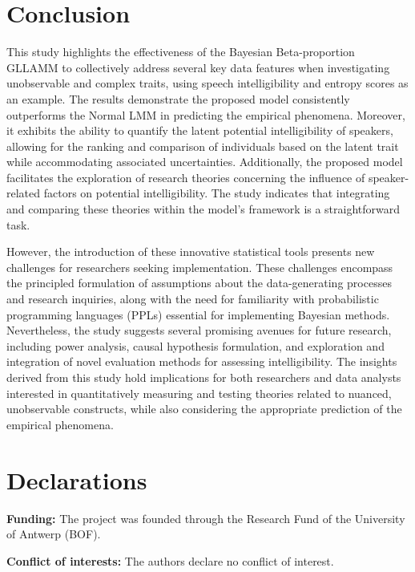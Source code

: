 \documentclass[
sn-apacite
]{sn-jnl}
\begin{document}
\section{Conclusion}\label{sec-conclusion}

This study highlights the effectiveness of the Bayesian Beta-proportion
GLLAMM to collectively address several key data features when
investigating unobservable and complex traits, using speech
intelligibility and entropy scores as an example. The results
demonstrate the proposed model consistently outperforms the Normal LMM
in predicting the empirical phenomena. Moreover, it exhibits the ability
to quantify the latent potential intelligibility of speakers, allowing
for the ranking and comparison of individuals based on the latent trait
while accommodating associated uncertainties. Additionally, the proposed
model facilitates the exploration of research theories concerning the
influence of speaker-related factors on potential intelligibility. The
study indicates that integrating and comparing these theories within the
model's framework is a straightforward task.

However, the introduction of these innovative statistical tools presents
new challenges for researchers seeking implementation. These challenges
encompass the principled formulation of assumptions about the
data-generating processes and research inquiries, along with the need
for familiarity with probabilistic programming languages (PPLs)
essential for implementing Bayesian methods. Nevertheless, the study
suggests several promising avenues for future research, including power
analysis, causal hypothesis formulation, and exploration and integration
of novel evaluation methods for assessing intelligibility. The insights
derived from this study hold implications for both researchers and data
analysts interested in quantitatively measuring and testing theories
related to nuanced, unobservable constructs, while also considering the
appropriate prediction of the empirical phenomena.

\newpage{}

\section*{Declarations}\label{declarations}

\textbf{Funding:} The project was founded through the Research Fund of
the University of Antwerp (BOF).

\textbf{Conflict of interests:} The authors declare no conflict of
interest.
\end{document}
